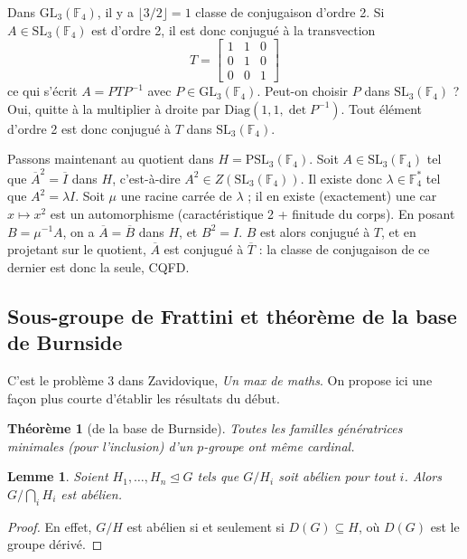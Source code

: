 \documentclass[a4paper, 11pt]{article}
\def\F{\mathbb{F}}
\def\GL{\mathrm{GL}}
\def\SL{\mathrm{SL}}
\def\PSL{\mathrm{PSL}}
\def\Diag{\mathrm{Diag}}
\newtheorem*{theorem}{Théorème}
\newtheorem*{lemma}{Lemme}
\begin{document}
Dans $\GL_3(\F_4)$, il y a $\lfloor 3/2 \rfloor = 1$ classe de conjugaison
d'ordre 2. Si $A \in \SL_3(\F_4)$ est d'ordre 2, il est donc conjugué à la
transvection
\[ T = \left[\begin{matrix}
      1 & 1 & 0 \\
      0 & 1 & 0 \\
      0 & 0 & 1
    \end{matrix}\right] \]
ce qui s'écrit $A = PTP^{-1}$ avec $P \in \GL_3(\F_4)$. Peut-on choisir $P$ dans
$\SL_3(\F_4)$ ? Oui, quitte à la multiplier à droite par $\Diag(1,1,\det
P^{-1})$. Tout élément d'ordre 2 est donc conjugué à $T$ dans $\SL_3(\F_4)$.

Passons maintenant au quotient dans $H = \PSL_3(\F_4)$. Soit $A \in \SL_3(\F_4)$
tel que $\overline{A}^2 = \overline{I}$ dans $H$, c'est-à-dire $A^2 \in
Z(\SL_3(\F_4))$. Il existe donc $\lambda \in \F_4^*$ tel que $A^2 = \lambda I$.
Soit $\mu$ une racine carrée de $\lambda$ ; il en existe (exactement) une car $x
\mapsto x^2$ est un automorphisme (caractéristique 2 + finitude du corps). En
posant $B = \mu^{-1}A$, on a $\overline{A} = \overline{B}$ dans $H$, et $B^2 =
I$. $B$ est alors conjugué à $T$, et en projetant sur le quotient,
$\overline{A}$ est conjugué à $\overline{T}$ : la classe de conjugaison de ce
dernier est donc la seule, CQFD.

\newpage

\subsection{Sous-groupe de Frattini et théorème de la base de Burnside}

C'est le problème 3 dans Zavidovique, \emph{Un max de maths}. On propose ici une
façon plus courte d'établir les résultats du début.

\begin{theorem}[de la base de Burnside]
  Toutes les familles génératrices minimales (pour l'inclusion) d'un $p$-groupe
  ont même cardinal.
\end{theorem}

\begin{lemma}
  Soient $H_1, \ldots, H_n \trianglelefteq G$ tels que $G/H_i$ soit abélien pour
  tout $i$. Alors $G/\bigcap_i H_i$ est abélien.
\end{lemma}
\begin{proof}
  En effet, $G/H$ est abélien si et seulement si $D(G) \subseteq H$, où $D(G)$
  est le groupe dérivé.
\end{proof}
\end{document}
